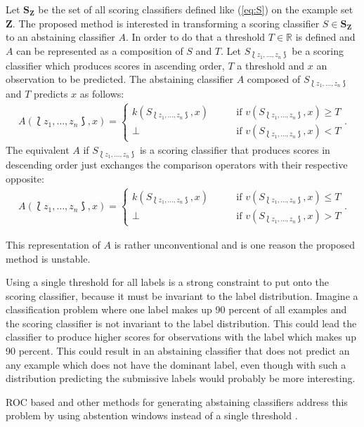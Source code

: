 \documentclass[twoside,11pt]{article}
\def\ds{\Lbag z_1,\dots,z_n \Rbag}
\def\Z{\textbf{Z}}
\def\S{\textbf{S}_{\Z}}
\begin{document}
Let $\S$ be the set of all scoring classifiers defined like
(\ref{eq:S}) on the example set $\Z$.
The proposed method is interested in transforming a
scoring classifier $S \in \S$ to an abstaining classifier
$A$.
In order to do that a threshold $T \in \mathbb{R}$ is
defined and $A$ can be represented as a composition of $S$
and $T$.
Let $S_{\ds}$ be a scoring classifier which produces scores
in ascending order, $T$ a threshold and $x$ an observation
to be predicted.
The abstaining classifier $A$ composed of $S_{\ds}$ and $T$
predicts $x$ as follows:
\begin{align}
  \label{eq:A}
  A(\ds, x) =
    \begin{cases}
      k(S_{\ds}, x) &\qquad \text{if }v(S_{\ds}, x)\geq T\\
      \bot &\qquad \text{if } v(S_{\ds}, x) < T
    \end{cases}.
\end{align}
The equivalent $A$ if $S_{\ds}$ is a scoring classifier
that produces scores in descending order just exchanges the
comparison operators with their respective opposite:
\begin{align}
  \label{eq:A2}
  A(\ds, x) =
    \begin{cases}
      k(S_{\ds}, x) &\qquad \text{if }v(S_{\ds}, x)\leq T\\
      \bot &\qquad \text{if } v(S_{\ds}, x) > T
    \end{cases}.
\end{align}

This representation of $A$ is rather unconventional and
is one reason the proposed method is unstable.

Using a single threshold for all labels is a strong
constraint to put onto the scoring classifier, because it
must be invariant to the label distribution.
Imagine a classification problem where one label makes up
90 percent of all examples and the scoring classifier is
not invariant to the label distribution.
This could lead the classifier to produce higher scores for
observations with the label which makes up 90 percent.
This could result in an abstaining classifier that does not
predict an any example which does not have the dominant
label, even though with such a distribution predicting
the submissive labels would probably be more interesting.

ROC based and other methods for generating abstaining
classifiers address this problem by using abstention
windows instead of a single threshold
\citep[see][]{friedel_et_al_2006}.
\end{document}
